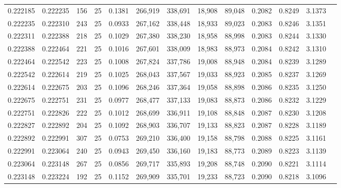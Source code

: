 \begin{tabular}{rrrrrrrrrrrrr}
0.222185 & 0.222235 &   156 &  25 &                                     0.1381 & 266,919 & 338,691 &  18,908 &  89,048 & 0.2082 & 0.8249 & 3.1373 \\
0.222235 & 0.222310 &   243 &  25 &                                     0.0933 & 267,162 & 338,448 &  18,933 &  89,023 & 0.2083 & 0.8246 & 3.1351 \\
0.222311 & 0.222388 &   218 &  25 &                                     0.1029 & 267,380 & 338,230 &  18,958 &  88,998 & 0.2083 & 0.8244 & 3.1330 \\
0.222388 & 0.222464 &   221 &  25 &                                     0.1016 & 267,601 & 338,009 &  18,983 &  88,973 & 0.2084 & 0.8242 & 3.1310 \\
0.222464 & 0.222542 &   223 &  25 &                                     0.1008 & 267,824 & 337,786 &  19,008 &  88,948 & 0.2084 & 0.8239 & 3.1289 \\
0.222542 & 0.222614 &   219 &  25 &                                     0.1025 & 268,043 & 337,567 &  19,033 &  88,923 & 0.2085 & 0.8237 & 3.1269 \\
0.222614 & 0.222675 &   203 &  25 &                                     0.1096 & 268,246 & 337,364 &  19,058 &  88,898 & 0.2086 & 0.8235 & 3.1250 \\
0.222675 & 0.222751 &   231 &  25 &                                     0.0977 & 268,477 & 337,133 &  19,083 &  88,873 & 0.2086 & 0.8232 & 3.1229 \\
0.222751 & 0.222826 &   222 &  25 &                                     0.1012 & 268,699 & 336,911 &  19,108 &  88,848 & 0.2087 & 0.8230 & 3.1208 \\
0.222827 & 0.222892 &   204 &  25 &                                     0.1092 & 268,903 & 336,707 &  19,133 &  88,823 & 0.2087 & 0.8228 & 3.1189 \\
0.222892 & 0.222991 &   307 &  25 &                                     0.0753 & 269,210 & 336,400 &  19,158 &  88,798 & 0.2088 & 0.8225 & 3.1161 \\
0.222991 & 0.223064 &   240 &  25 &                                     0.0943 & 269,450 & 336,160 &  19,183 &  88,773 & 0.2089 & 0.8223 & 3.1139 \\
0.223064 & 0.223148 &   267 &  25 &                                     0.0856 & 269,717 & 335,893 &  19,208 &  88,748 & 0.2090 & 0.8221 & 3.1114 \\
0.223148 & 0.223224 &   192 &  25 &                                     0.1152 & 269,909 & 335,701 &  19,233 &  88,723 & 0.2090 & 0.8218 & 3.1096 \\

\end{tabular}
